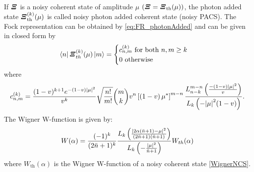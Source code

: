         If $\bm{\relax{\varXi}}$ is a noisy coherent state of amplitude $\mu$ 
        $(\bm{\relax{\varXi}}=\bm{\relax{\varXi}}_{\mathrm{th}}(\mu))$,
        the photon added state $\bm{\relax{\varXi}}_{\mathrm{th}}^{(k)}(\mu)$ is called noisy photon added coherent state
        (noisy PACS).
        The Fock representation can be obtained by \ref{eq:FR_photonAdded} and can be given in closed
        form by \cite{PACSDisc}
        \begin{equation}
            \bra{n}\bm{\relax{\varXi}}_{th}^{(k)}(\mu)\ket{m}=
            \begin{cases}
                c_{n,m}^{(k)} \mbox{\ for\ both\ } n,m \geq k\\
                0\mbox{\ otherwise}
            \end{cases}
        \end{equation}
        where
        \begin{equation*}
            c_{n,m}^{(k)}=\frac{(1-v)^{k+1}e^{-(1-v)\absolutevalue{\mu}^2}}{v^k}
            \sqrt{\frac{n!}{m!}}\binom{m}{k} v^n \left[\left(1-v\right)\mu^*\right]^{m-n}
            \frac{L^{m-n}_{n-k} \left( \frac{-(1-v)\absolutevalue{\mu}^2}{v} \right)}
            {L_k \left( -\absolutevalue{\mu}^2 (1-v) \right)}.
        \end{equation*}
        The Wigner W-function is given by:
        \begin{equation}
            W(\alpha)=\frac{(-1)^k}{(2\bar{n}+1)^k}\frac{L_k \left( 
                \frac{\absolutevalue{2\alpha(\bar{n}+1)-\mu}^2}{(2\bar{n}+1)(\bar{n}+1)} \right)}
                {L_k \left(-\frac{\absolutevalue{\mu}^2}{\bar{n}+1} \right)} W_{th}(\alpha)
        \end{equation}
        where $W_{\mathrm{th}}(\alpha)$ is the Wigner W-function of a noisy coherent state \ref{WignerNCS}.
        
